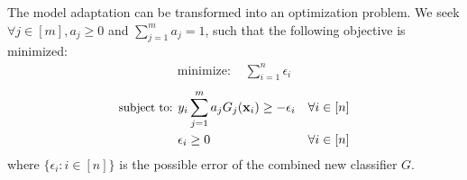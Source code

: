 \documentclass[letterpaper]{article}
\begin{document}
%

The model adaptation can be transformed into an optimization problem. We seek  $\forall j\in [m], a_j \geq 0$ and $\sum_{j=1}^m a_j = 1$, such that the following objective is minimized:
\begin{align}
\textrm{minimize: } & \sum_{i=1}^n \epsilon_i
\label{model}
\end{align}
\vspace{-0.5cm}
\begin{align*}
\small
\textrm{subject to: }
& y_i\sum_{j=1}^m a_jG_j(\mathbf{x}_i) \geq - \epsilon_i & \forall i \in [n]\\
& \epsilon_i \geq 0 & \forall i \in [n]
\label{eqn:lp}
\end{align*}
where $\{\epsilon_i : i \in [n]\}$ is the possible error of the combined new classifier $G$. %
\end{document}
